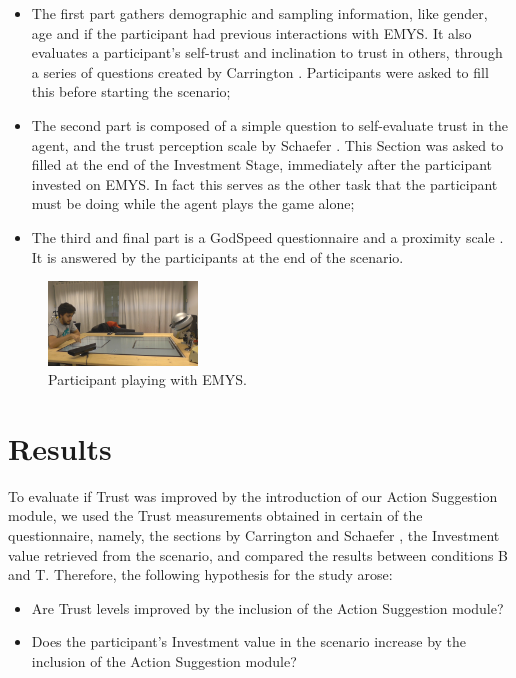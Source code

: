 \begin{itemize}
    \item The first part gathers demographic and sampling information, like gender, age and if the participant had previous interactions with \ac{EMYS}. It also evaluates a participant's self-trust and inclination to trust in others, through a series of questions created by Carrington \cite{Carrington2007}. Participants were asked to fill this before starting the scenario;
    \item The second part is composed of a simple question to self-evaluate trust in the agent, and the trust perception scale by Schaefer \cite{Schaefer2013}. This Section was asked to filled at the end of the Investment Stage, immediately after the participant invested on \ac{EMYS}. In fact this serves as the other task that the participant must be doing while the agent plays the game alone;
    \item The third and final part is a GodSpeed questionnaire \cite{Bartneck2009,Lehmann2015} and a proximity scale \cite{Aron1992}. It is answered by the participants at the end of the scenario.
\end{itemize}

\begin{figure}[]
    \centering
    \includegraphics[width=150px]{figures/ScenarioScreenShot.png}
    \caption{Participant playing with EMYS.}
    \label{fig:ScenarioScreenShot}
\end{figure}

\section{Results}
To evaluate if Trust was improved by the introduction of our Action Suggestion module, we used the Trust measurements obtained in certain of the questionnaire, namely, the sections by Carrington \cite{Carrington2007} and Schaefer \cite{Schaefer2009}, the Investment value retrieved from the scenario, and compared the results between conditions B and T. Therefore, the following hypothesis for the study arose:

\begin{itemize}
    \item Are Trust levels improved by the inclusion of the Action Suggestion module?
    \item Does the participant's Investment value in the scenario increase by the inclusion of the Action Suggestion module?
\end{itemize}

